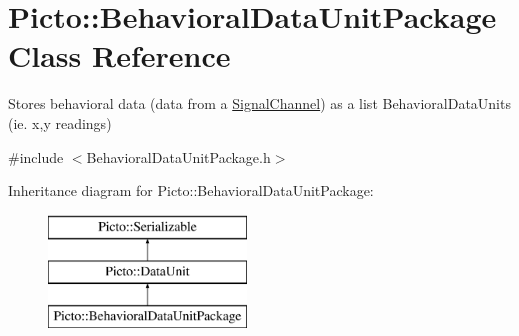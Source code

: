 \hypertarget{class_picto_1_1_behavioral_data_unit_package}{\section{Picto\-:\-:Behavioral\-Data\-Unit\-Package Class Reference}
\label{class_picto_1_1_behavioral_data_unit_package}
}


Stores behavioral data (data from a \hyperlink{class_picto_1_1_signal_channel}{Signal\-Channel}) as a list Behavioral\-Data\-Units (ie. x,y readings)  




{\ttfamily \#include $<$Behavioral\-Data\-Unit\-Package.\-h$>$}

Inheritance diagram for Picto\-:\-:Behavioral\-Data\-Unit\-Package\-:\begin{figure}[H]
\begin{center}
\leavevmode
\includegraphics[height=3.000000cm]{class_picto_1_1_behavioral_data_unit_package}
\end{center}
\end{figure}
